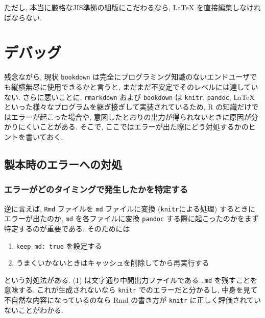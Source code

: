 \documentclass[
  nomag]{bxjsbook}
\providecommand{\tightlist}{%
  \setlength{\itemsep}{0pt}\setlength{\parskip}{0pt}}
\theoremstyle{definition}
\theoremstyle{definition}
\theoremstyle{definition}
\theoremstyle{remark}
\begin{document}
ただし, 本当に厳格なJIS準拠の組版にこだわるなら, LaTeX
を直接編集しなければならない.

\hypertarget{part-ux30c7ux30d0ux30c3ux30b0}{%
\part{デバッグ}\label{part-ux30c7ux30d0ux30c3ux30b0}}

残念ながら, 現状 \texttt{bookdown}
は完全にプログラミング知識のないエンドユーザでも縦横無尽に使用できるかと言うと,
まだまだ不安定でそのレベルには達していない. さらに悪いことに,
\texttt{rmarkdown} および \texttt{bookdown} は \texttt{knitr},
\texttt{pandoc}, LaTeX
といった様々なプログラムを継ぎ接ぎして実装されているため, R
の知識だけではエラーが起こった場合や,
意図したとおりの出力が得られないときに原因が分かりにくいことがある.
そこで, ここではエラーが出た際にどう対処するかのヒントを書いておく.

\hypertarget{ux88fdux672cux6642ux306eux30a8ux30e9ux30fcux3078ux306eux5bfeux51e6}{%
\chapter{製本時のエラーへの対処}\label{ux88fdux672cux6642ux306eux30a8ux30e9ux30fcux3078ux306eux5bfeux51e6}}

\hypertarget{ux30a8ux30e9ux30fcux304cux3069ux306eux30bfux30a4ux30dfux30f3ux30b0ux3067ux767aux751fux3057ux305fux304bux3092ux7279ux5b9aux3059ux308b}{%
\section{エラーがどのタイミングで発生したかを特定する}\label{ux30a8ux30e9ux30fcux304cux3069ux306eux30bfux30a4ux30dfux30f3ux30b0ux3067ux767aux751fux3057ux305fux304bux3092ux7279ux5b9aux3059ux308b}}

逆に言えば, \texttt{Rmd} ファイルを \texttt{md} ファイルに変換
(\texttt{knitr}による処理) するときにエラーが出たのか, \texttt{md}
を各ファイルに変換 \texttt{pandoc}
する際に起こったのかをまず特定するのが重要である. そのためには

\begin{enumerate}
\def\labelenumi{\arabic{enumi}.}
\tightlist
\item
  \texttt{keep\_md:\ true} を設定する
\item
  うまくいかないときはキャッシュを削除してから再実行する
\end{enumerate}

という対処法がある. (1) は文字通り中間出力ファイルである \texttt{.md}
を残すことを意味する. これが生成されないなら \texttt{knitr}
でのエラーだと分かるし, 中身を見て不自然な内容になっているのなら Rmd
の書き方が \texttt{knitr} に正しく評価されていないことがわかる.
\end{document}
